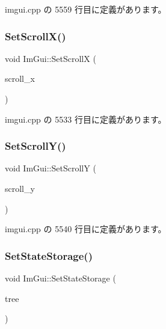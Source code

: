  imgui.\+cpp の 5559 行目に定義があります。

\mbox{\label{namespace_im_gui_a0796750de8c50555d895f63e79ac87f0}} 
\subsubsection{\texorpdfstring{Set\+Scroll\+X()}{SetScrollX()}}
{\footnotesize\ttfamily void Im\+Gui\+::\+Set\+ScrollX (\begin{DoxyParamCaption}\item[{float}]{scroll\+\_\+x }\end{DoxyParamCaption})}



 imgui.\+cpp の 5533 行目に定義があります。

\mbox{\label{namespace_im_gui_a41833555962807384432e6fc94d46ec9}} 
\subsubsection{\texorpdfstring{Set\+Scroll\+Y()}{SetScrollY()}}
{\footnotesize\ttfamily void Im\+Gui\+::\+Set\+ScrollY (\begin{DoxyParamCaption}\item[{float}]{scroll\+\_\+y }\end{DoxyParamCaption})}



 imgui.\+cpp の 5540 行目に定義があります。

\mbox{\label{namespace_im_gui_a635f4511603cc6284d8b21fb8d53090d}} 
\subsubsection{\texorpdfstring{Set\+State\+Storage()}{SetStateStorage()}}
{\footnotesize\ttfamily void Im\+Gui\+::\+Set\+State\+Storage (\begin{DoxyParamCaption}\item[{\mbox{\hyperlink{struct_im_gui_storage}{Im\+Gui\+Storage}} $\ast$}]{tree }\end{DoxyParamCaption})}



